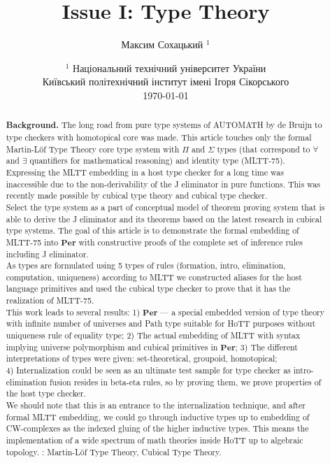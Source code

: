 \documentclass{article}
\theoremstyle{definition}
\begin{document}
\title{Issue I: Type Theory}
\author{Максим Сохацький $^1$}
\date{ $^1$ Національний технічний університет України \\
       \small Київський політехнічний інститут імені Ігоря Сікорського \\
       \today }

\maketitle

\begin{abstract}

{\bf Background.} The long road from pure type systems of AUTOMATH by de Bruijn to type
checkers with homotopical core was made. This article touches only
the formal Martin-Löf Type Theory core type system with $\Pi$ and $\Sigma$ types (that correspond
to $\forall$ and $\exists$ quantifiers for mathematical reasoning) and identity type (MLTT-75).
Expressing the MLTT embedding in a host type checker for a long time was
inaccessible due to the non-derivability of the J eliminator in pure functions.
This was recently made possible by cubical type theory and cubical type checker.\\
 Select the type system as a part of conceptual model of theorem proving system that is
able to derive the J eliminator and its theorems based on the latest research in cubical type systems.
The goal of this article is to demonstrate the formal embedding of MLTT-75 into $\mathbf{Per}$ with constructive proofs
of the complete set of inference rules including J eliminator.\\
As types are formulated using 5 types of rules (formation, intro, elimination, computation, uniqueness) according to MLTT
we constructed aliases for the host language primitives and used the cubical type checker to prove that it has
the realization of MLTT-75. \\
 This work leads to several results:
1) $\mathbf{Per}$ --- a special embedded version of type theory with infinite number of universes and Path type suitable for HoTT purposes without uniqueness rule of equality type;
2) The actual embedding of MLTT with syntax implying universe polymorphism and cubical primitives in $\mathbf{Per}$;
3) The different interpretations of types were given: set-theoretical, groupoid, homotopical; \\
4) Internalization could be seen as an ultimate test sample for type checker as intro-elimination fusion resides in beta-eta rules, so by proving them, we prove properties of the host type checker. \\
 We should note that this is an entrance to the internalization
technique, and after formal MLTT embedding, we could go through
inductive types up to embedding of CW-complexes as the indexed
gluing of the higher inductive types. This means the implementation
of a wide spectrum of math theories inside HoTT up to algebraic topology.
: Martin-Löf Type Theory, Cubical Type Theory.

\end{abstract}
\end{document}
